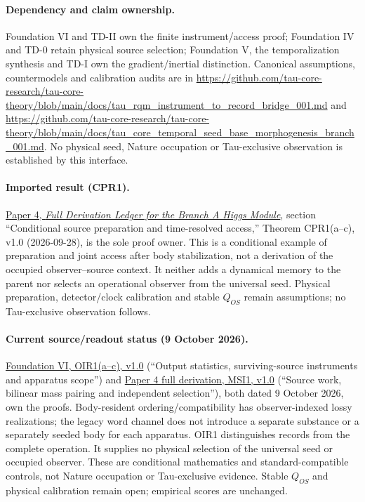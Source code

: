 \documentclass[11pt]{article}
\begin{document}
\paragraph{Dependency and claim ownership.}
Foundation VI and TD-II own the finite instrument/access proof; Foundation IV and TD-0 retain physical source selection; Foundation V, the temporalization synthesis and TD-I own the gradient/inertial distinction. Canonical assumptions, countermodels and calibration audits are in \url{https://github.com/tau-core-research/tau-core-theory/blob/main/docs/tau_rqm_instrument_to_record_bridge_001.md} and \url{https://github.com/tau-core-research/tau-core-theory/blob/main/docs/tau_core_temporal_seed_base_morphogenesis_branch_001.md}. No physical seed, Nature occupation or Tau-exclusive observation is established by this interface.

\paragraph{Imported result (CPR1).}
\href{https://github.com/tau-core-research/tau-core-higgs-module-paper4/blob/main/paper4_full_derivation/full_derivation.pdf#nameddest=cpr1}{Paper 4, \emph{Full Derivation Ledger for the Branch A Higgs Module}}, section ``Conditional source preparation and time-resolved access,'' Theorem CPR1(a--c), v1.0 (2026-09-28), is the sole proof owner.
This is a conditional example of preparation and joint access after body stabilization, not a derivation of the occupied observer--source context. It neither adds a dynamical memory to the parent nor selects an operational observer from the universal seed.
Physical preparation, detector/clock calibration and stable $Q_{OS}$ remain assumptions; no Tau-exclusive observation follows.

\paragraph{Current source/readout status (9 October 2026).}
\href{https://github.com/tau-core-research/tau-core-quantum-readout-foundation-paper-vi/blob/main/paperVI_submission_source/main.pdf#nameddest=oir1}{Foundation VI, OIR1(a--c), v1.0} (``Output statistics, surviving-source instruments and apparatus scope'') and \href{https://github.com/tau-core-research/tau-core-higgs-module-paper4/blob/main/paper4_full_derivation/full_derivation.pdf#nameddest=msi1}{Paper 4 full derivation, MSI1, v1.0} (``Source work, bilinear mass pairing and independent selection''), both dated 9 October 2026, own the proofs.
Body-resident ordering/compatibility has observer-indexed lossy realizations; the legacy word channel does not introduce a separate substance or a separately seeded body for each apparatus. OIR1 distinguishes records from the complete operation. It supplies no physical selection of the universal seed or occupied observer.
These are conditional mathematics and standard-compatible controls, not Nature occupation or Tau-exclusive evidence. Stable $Q_{OS}$ and physical calibration remain open; empirical scores are unchanged.
\end{document}
